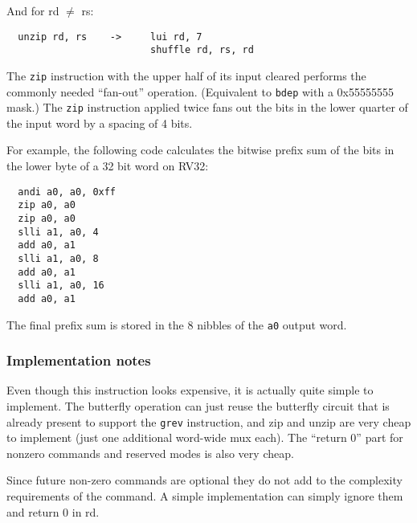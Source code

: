 And for rd $\neq$ rs:

\begin{verbatim}
  unzip rd, rs    ->     lui rd, 7
                         shuffle rd, rs, rd
\end{verbatim}

The \texttt{zip} instruction with the upper half of its input cleared performs
the commonly needed ``fan-out'' operation. (Equivalent to {\tt bdep} with a
0x55555555 mask.) The \texttt{zip} instruction applied twice fans out the bits
in the lower quarter of the input word by a spacing of 4 bits.

For example, the following code calculates the bitwise prefix sum of the bits
in the lower byte of a 32 bit word on RV32:

\begin{verbatim}
  andi a0, a0, 0xff
  zip a0, a0
  zip a0, a0
  slli a1, a0, 4
  add a0, a1
  slli a1, a0, 8
  add a0, a1
  slli a1, a0, 16
  add a0, a1
\end{verbatim}

The final prefix sum is stored in the 8 nibbles of the {\tt a0} output word.

\subsubsection{Implementation notes}

Even though this instruction looks expensive, it is actually quite simple to
implement.  The butterfly operation can just reuse the butterfly circuit that
is already present to support the {\tt grev} instruction, and zip and unzip are
very cheap to implement (just one additional word-wide mux each). The ``return
0'' part for nonzero commands and reserved modes is also very cheap.

Since future non-zero commands are optional they do not add to the complexity
requirements of the command. A simple implementation can simply ignore them
and return 0 in rd.

